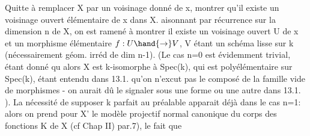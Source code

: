 Quitte à remplacer X par un voisinage donné de x,  
  montrer qu'il existe un voisinage ouvert élémentaire de x dans X.
  aisonnant par récurrence sur
la dimension n de X, on  est ramené à montrer  il existe
un voisinage ouvert U de x et un morphisme élémentaire $f: U\hand{\to} V$,
V étant un schéma lisse sur k (nécessairement géom. irréd  de dim n-1).
 (Le cas n=0 est évidemment trivial, étant donné qu alors
X est k-isomorphe à Spec(k), qui est polyélémentaire sur Spec(k), étant
entendu dans 13.1. qu'on n'excut pas le composé de la famille vide de
morphismes - on aurait dû le signaler sous une forme ou une autre dans
13.1. ). La nécessité de supposer k parfait au préalable apparait déjà
dans le cas n=1: alors on prend pour X' le modèle projectif normal
canonique du corps des fonctions K de X (cf Chap II) par.7), le fait que


